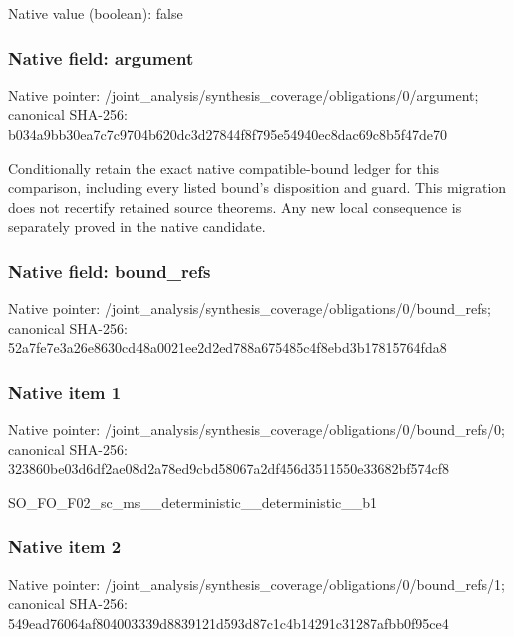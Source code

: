 \documentclass[10pt,a4paper]{article}
\begin{document}
Native value (boolean): false

\subsubsection{Native field: argument}
Native pointer: /joint\_\allowbreak{}analysis/synthesis\_\allowbreak{}coverage/obligations/0/argument; canonical SHA-256: b034a9bb30ea7c7c9704b620dc3d27844f8f795e54940ec8dac69c8b5f47de70

\begingroup\raggedright\sloppy Conditionally retain the exact native compatible-bound ledger for this comparison,\allowbreak{} including every listed bound's disposition and guard. This migration does not recertify retained source theorems. Any new local consequence is separately proved in the native candidate.\par\endgroup

\subsubsection{Native field: bound\_\allowbreak{}refs}
Native pointer: /joint\_\allowbreak{}analysis/synthesis\_\allowbreak{}coverage/obligations/0/bound\_\allowbreak{}refs; canonical SHA-256: 52a7fe7e3a26e8630cd48a0021ee2d2ed788a675485c4f8ebd3b17815764fda8

\subsubsection{Native item 1}
Native pointer: /joint\_\allowbreak{}analysis/synthesis\_\allowbreak{}coverage/obligations/0/bound\_\allowbreak{}refs/0; canonical SHA-256: 323860be03d6df2ae08d2a78ed9cbd58067a2df456d3511550e33682bf574cf8

\begingroup\raggedright\sloppy SO\_\allowbreak{}FO\_\allowbreak{}F02\_\allowbreak{}sc\_\allowbreak{}ms\_\allowbreak{}\_\allowbreak{}deterministic\_\allowbreak{}\_\allowbreak{}deterministic\_\allowbreak{}\_\allowbreak{}b1\par\endgroup

\subsubsection{Native item 2}
Native pointer: /joint\_\allowbreak{}analysis/synthesis\_\allowbreak{}coverage/obligations/0/bound\_\allowbreak{}refs/1; canonical SHA-256: 549ead76064af804003339d8839121d593d87c1c4b14291c31287afbb0f95ce4
\end{document}
